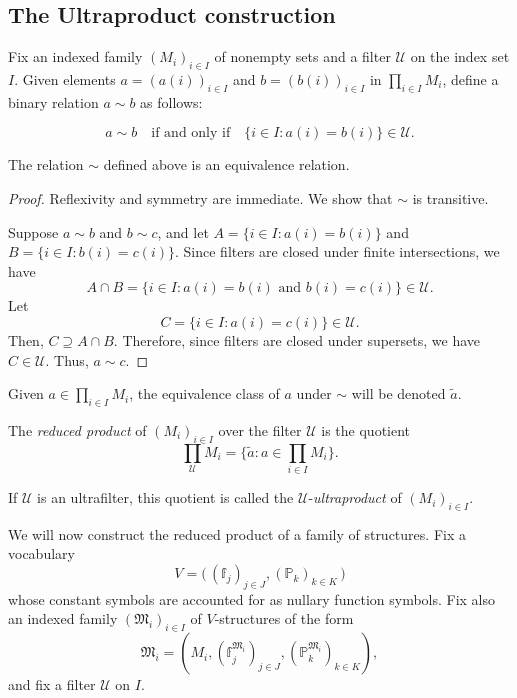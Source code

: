 \documentclass{scrartcl}
\newcommand{\SU}{\mathscr{U}}
\begin{document}
\subsection{The Ultraproduct construction}

Fix an indexed family $(M_i)_{i\in I}$ of nonempty sets and a filter $\mathscr{U}$ on the index set $I$. Given elements $a=(a(i))_{i\in I}$ and $b=(b(i))_{i\in I}$ in $\prod_{i\in I} M_i$, define a binary relation $a\sim b$ as follows:

\[
a\sim b
\quad\text{if and only if}\quad
 \{i\in I\colon a(i)=b(i)\}\in\mathscr{U}.
\]



\begin{proposition}
  The relation $\sim$ defined above is an equivalence relation.
\end{proposition}

\begin{proof}
Reflexivity and symmetry are immediate. We show that $\sim$ is transitive.

Suppose $a\sim b$ and $b\sim c$, and let $A=\{i\in I\colon a(i)=b(i)\}$ and $B=\{i\in I\colon b(i)=c(i)\}$. Since filters are closed under finite intersections, we have
\[
A\cap B = \{i\in I\colon a(i)=b(i)\text{ and }b(i)=c(i)\} \in\mathscr{U}.
\]
Let 
\[
C= \{i\in I\colon a(i)=c(i)\} \in \mathscr{U}.
\]
Then, $C\supseteq A\cap B$. Therefore, since filters are closed under supersets, we have $C\in\SU$. Thus,
$a\sim c$.
\end{proof}




Given $a\in \prod_{i\in I} M_i$, 
the equivalence class of $a$ under $\sim$
will be denoted $\tilde{a}$.



\begin{definition}
The \emph{reduced product} of $(M_i)_{i\in I}$ over the filter $\mathscr{U}$ is the quotient
\[
\prod_\mathscr{U}M_i = \{\tilde{a}\colon a\in \prod_{i\in I} M_i\}.
\]

If $\SU$ is an ultrafilter, this quotient is called the $\SU$-\emph{ultraproduct} of $(M_i)_{i\in I}$.
\end{definition}





We will now construct the reduced product of a family of structures. Fix a vocabulary
\[
V = \big(\,(\mathbb{f}_j)_{j\in J}, (\mathbb{P}_k)_{k\in K}\,\big)
\]
whose constant symbols are accounted for as nullary function symbols. Fix also an indexed family $(\mathfrak{M}_i)_{i\in I}$ of $V$-structures of the form
\[
\mathfrak{M}_i = (M_i, (\mathbb{f}^{\mathfrak{M}_i}_j)_{j\in J},(\mathbb{P}^{\mathfrak{M}_i}_k)_{k\in K}),
\]
and fix a filter $\mathscr{U}$ on $I$.
\end{document}
